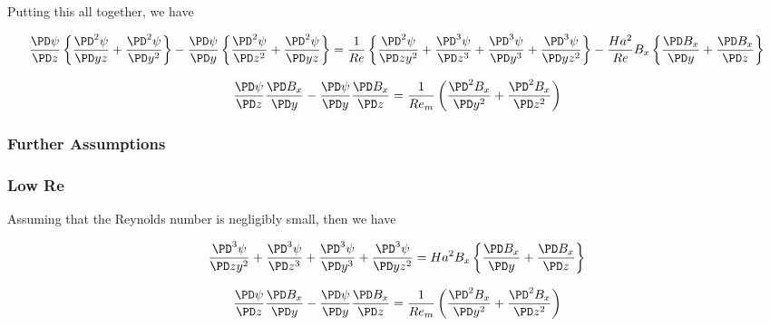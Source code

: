 \documentclass[11pt]{article}
\begin{document}
Putting this all together, we have

\begin{equation}
	\frac{\PD \psi }{\PD z}
	\left\{
	\frac{\PD^2 \psi}{\PD yz}
	+
	\frac{\PD^2 \psi}{\PD y^2}
	\right\}
	-
	\frac{\PD \psi}{\PD y}
	\left\{
	\frac{\PD^2 \psi}{\PD z^2}
	+
	\frac{\PD^2 \psi}{\PD yz}
	\right\}
	=
	\frac{1}{Re}
	\left\{
	\frac{\PD^2 \psi}{\PD z y^2}
	+
	\frac{\PD^3 \psi}{\PD z^3}
	+
	\frac{\PD^3 \psi}{\PD y^3}
	+\frac{\PD^3 \psi}{\PD y z^2}
	\right\}
	-
	\frac{Ha^2}{Re}
	B_x
	\left\{
	\frac{\PD B_x}{\PD y}
	+
	\frac{\PD B_x}{\PD z}
	\right\}
\end{equation}

\begin{equation}
	\frac{\PD \psi}{\PD z}
	\frac{\PD B_x}{\PD y}
	-
	\frac{\PD \psi}{\PD y}
	\frac{\PD B_x}{\PD z}
	=
	\frac{1}{Re_m}
	\left(
	\frac{\PD^2 B_x}{\PD y^2}
	+ \frac{\PD^2 B_x}{\PD z^2}
	\right)
\end{equation}


\subsubsection{Further Assumptions}

\subsubsection{Low Re}
Assuming that the Reynolds number is negligibly small, then we have


\begin{equation}
	\frac{\PD^3 \psi}{\PD z y^2}
	+
	\frac{\PD^3 \psi}{\PD z^3}
	+
	\frac{\PD^3 \psi}{\PD y^3}
	+\frac{\PD^3 \psi}{\PD y z^2}
	=
	Ha^2
	B_x
	\left\{
	\frac{\PD B_x}{\PD y}
	+
	\frac{\PD B_x}{\PD z}
	\right\}
\end{equation}

\begin{equation}
	\frac{\PD \psi}{\PD z}
	\frac{\PD B_x}{\PD y}
	-
	\frac{\PD \psi}{\PD y}
	\frac{\PD B_x}{\PD z}
	=
	\frac{1}{Re_m}
	\left(
	\frac{\PD^2 B_x}{\PD y^2}
	+ \frac{\PD^2 B_x}{\PD z^2}
	\right)
\end{equation}




\end{document}
